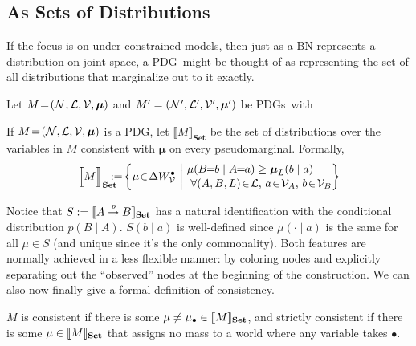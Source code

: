 \documentclass{article}
\newcommand\changed[1]{{\color{note-fg} #1}}
\newcommand\changeon{\color{note-fg} }
\newcommand\Set{\textbf{Set}}
\newcommand{\MN}{PDG}
\newcommand{\MNs}{\MN s}
\def\seq{\!=\!}
\begin{document}
	\subsection{As Sets of Distributions}\label{sec:set-of-distribution-semantics}
	If the focus is on under-constrained models, then just as a BN represents a distribution on joint space, a \MN\ might be thought of as representing the set of all distributions that marginalize out to it exactly. 
	
	
	\begin{defn}
		Let $M \!=\!\mnvars[]$ and $M'= \mnvars[']$ be \MNs\ with 
	\end{defn}
	

	
	\begin{defn}
		If $M\seq\mnvars[]$ is a \MN, let $\llbracket M \rrbracket_\Set$ be the set of distributions over the variables in $M$ consistent with $\boldsymbol\mu$ on every \changed{pseudomarginal}. Formally,		
		\[ \Big\llbracket M \Big\rrbracket_\Set \hspace{-2ex} := \!\left\{\mu \!\in\! \Delta W_{\cal V}^\bullet\ \middle|\!
		\begin{array}{l}
		\mu(B\!\! =\!\!b \mid A\!\!=\!\!a) \geq \boldsymbol\mu_L(b \mid a) \\[0.1em]
		~\text{$\forall (A, B, L) \!\in\! \mathcal L$, $a \!\in\!\mathcal V_A$, $b \!\in\! \mathcal V_B$} \end{array}\!\!\! \right\}\]
	\end{defn}
	
	\changeon
	Notice that $S := \bbr{
		A \overset{p}{\to} B
	}_\Set$ has a natural identification with 
	the conditional distribution $p( B \mid A)$. $S(b\mid a)$ is well-defined since $\mu(\cdot\mid a)$ is the same for all $\mu \in S$ (and unique since it's the only commonality). Both features are normally achieved in a less flexible manner: by coloring nodes and explicitly separating out the ``observed'' nodes at the beginning of the construction.
	We can also now finally give a formal definition of consistency.
	\begin{defn} \label{def:weak-consistent}
		$M$ is consistent if there is some $\mu \neq \mu_\bullet \in \bbr{M}_\Set$, and strictly consistent if there is some $\mu \in \bbr{M}_\Set$ that assigns no mass to a world where any variable takes $\bullet$.
	\end{defn}
	
\end{document}
